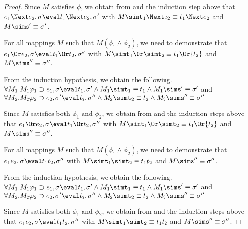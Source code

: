 \begin{proof}
{  Since $M$ satisfies $\phi$,
  we obtain from  and the induction step above that $e_1\Next e_2,\sigma\eval t_1\Next e_2,\sigma'$ with $M \simt_1\Next e_2 \equiv {t_1}\Next e_2$ and $M \sims' \equiv{\sigma'}$.

  }

  {For all mappings $M$ such that $M(\phi_1\wedge \phi_2)$, we need to demonstrate that\\
   $e_1\Or e_2,\sigma\eval t_1\Or t_2,\sigma''$ with $M \simt_1\Or \simt_2 \equiv {t_1}\Or{t_2}$ and $M\sims''\equiv{\sigma''}$.

  From the induction hypothesis, we obtain the following.\\
  $\forall M_1 .  M_1\phi_1 \implies e_1, \sigma {\eval}{t_1},{\sigma'}\land  M_1 \simt_1\equiv {t_1} \land  M_1\sims'\equiv{\sigma'}$ and\\
  $\forall M_2 . M_2\phi_2 \implies e_2,\sigma' {\eval}{t_2},{\sigma''}\land M_2\simt_2\equiv {t_2} \land M_2\sims''\equiv{\sigma''}$

  Since $M$ satisfies both $\phi_1$ and $\phi_2$, we obtain from  and the induction steps above that $e_1\Or e_2,\sigma\eval t_1\Or t_2,\sigma''$ with $M \simt_1\Or \simt_2 \equiv {t_1}\Or{t_2}$ and $M \sims'' \equiv{\sigma''}$.

  }

    {For all mappings $M$ such that $M(\phi_1\wedge \phi_2)$, we need to demonstrate that\\
     $e_1\And e_2,\sigma\eval t_1\And t_2,\sigma''$ with $M \simt_1\And \simt_2 \equiv {t_1}\And{t_2}$ and $M\sims''\equiv{\sigma''}$.

    From the induction hypothesis, we obtain the following.\\
    $\forall M_1 .  M_1\phi_1 \implies e_1, \sigma {\eval}{t_1},{\sigma'}\land  M_1 \simt_1\equiv {t_1} \land  M_1\sims'\equiv{\sigma'}$ and\\
    $\forall M_2 . M_2\phi_2 \implies e_2,\sigma' {\eval}{t_2},{\sigma''}\land M_2\simt_2\equiv {t_2} \land M_2\sims''\equiv{\sigma''}$

    Since $M$ satisfies both $\phi_1$ and $\phi_2$, we obtain from  and the induction steps above that $e_1\And e_2,\sigma\eval t_1\And t_2,\sigma''$ with $M \simt_1\And \simt_2 \equiv {t_1}\And{t_2}$ and $M \sims'' \equiv{\sigma''}$.

    }

\end{proof}


